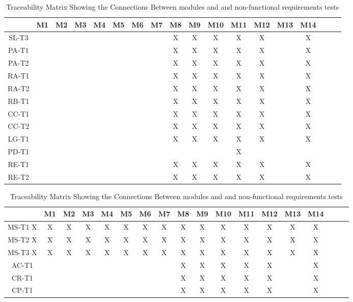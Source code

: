 \documentclass[12pt, oneside, openany, titlepage]{article}
\begin{document}
\begin{landscape}
\begin{table}[h!]
\centering
\begin{tabular}{|c|c|c|c|c|c|c|c|c|c|c|c|c|c|c|c|c|c|}
\hline
	& M1 & M2 & M3 & M4 & M5 & M6 & M7 & M8 & M9 & M10 & M11 & M12 & M13& M14\\
\hline
SL-T3        & & & & & & & & X& X& X& X& X& &X \\ \hline
PA-T1        & & & & & & & & X& X& X& X& X& &X \\ \hline
PA-T2        & & & & & & & & X& X& X& X& X& &X \\ \hline
RA-T1        & & & & & & & & X& X& X& X& X& &X \\ \hline
RA-T2        & & & & & & & & X& X& X& X& X& &X \\ \hline
RB-T1        & & & & & & & & X& X& X& X& X& &X \\ \hline
CC-T1        & & & & & & & & X& X& X& X& X& &X \\ \hline
CC-T2        & & & & & & & & X& X& X& X& X& &X \\ \hline
LG-T1        & & & & & & & & X& X& X& X& X& &X \\ \hline
PD-T1        & & & & & & & & & & & X& & & \\ \hline
RE-T1        & & & & & & & & X& X& X& X& X& &X \\ \hline
RE-T2        & & & & & & & & X& X& X& X& X& &X \\ \hline
\end{tabular}
\caption{Traceability Matrix Showing the Connections Between modules and  and non-functional requirements tests}
\label{Table:A_trace}
\end{table}
\end{landscape}

\begin{landscape}
\begin{table}[h!]
\centering
\begin{tabular}{|c|c|c|c|c|c|c|c|c|c|c|c|c|c|c|c|c|c|}
\hline
	& M1 & M2 & M3 & M4 & M5 & M6 & M7 & M8 & M9 & M10 & M11 & M12 & M13& M14\\
\hline
MS-T1        X& X& X& X& X& X& X& X& X& X& X& X& X& X&X \\ \hline
MS-T2        X& X& X& X& X& X& X& X& X& X& X& X& X& X&X \\ \hline
MS-T3        X& X& X& X& X& X& X& X& X& X& X& X& X& X&X \\ \hline
AC-T1        & & & & & & & & X& X& X& X& X& &X \\ \hline
CR-T1        & & & & & & & & X& X& X& X& X& &X \\ \hline
CP-T1        & & & & & & & & X& X& X& X& X& &X \\ \hline
\end{tabular}
\caption{Traceability Matrix Showing the Connections Between modules and  and non-functional requirements tests}
\label{Table:A_trace}
\end{table}
\end{landscape}
\end{document}
